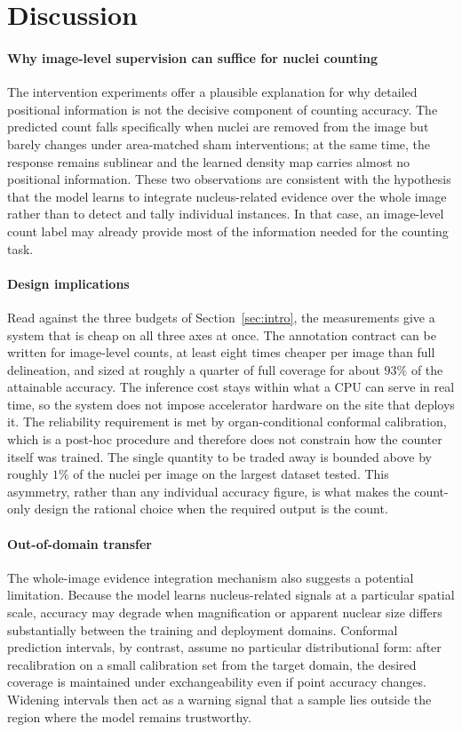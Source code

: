 \documentclass[preprint,12pt]{elsarticle}
\begin{document}
\section{Discussion}\label{sec:discuss}

\paragraph{Why image-level supervision can suffice for nuclei counting} The intervention experiments offer a
plausible explanation for why detailed positional information is not the decisive component of counting
accuracy. The predicted count falls specifically when nuclei are removed from the image but barely changes
under area-matched sham interventions; at the same time, the response remains sublinear and the learned density
map carries almost no positional information. These two observations are consistent with the hypothesis that
the model learns to integrate nucleus-related evidence over the whole image rather than to detect and tally
individual instances. In that case, an image-level count label may already provide most of the information
needed for the counting task.

\paragraph{Design implications} Read against the three budgets of Section~\ref{sec:intro}, the measurements
give a system that is cheap on all three axes at once. The annotation contract can be written for image-level
counts, at least eight times cheaper per image than full delineation, and sized at roughly a quarter of full
coverage for about $93\%$ of the attainable accuracy. The inference cost stays within what a CPU can serve in
real time, so the system does not impose accelerator hardware on the site that deploys it. The reliability
requirement is met by organ-conditional conformal calibration, which is a post-hoc procedure and therefore does
not constrain how the counter itself was trained. The single quantity to be traded away is bounded above by
roughly $1\%$ of the nuclei per image on the largest dataset tested. This asymmetry, rather than any individual
accuracy figure, is what makes the count-only design the rational choice when the required output is the count.

\paragraph{Out-of-domain transfer} The whole-image evidence integration mechanism also suggests a potential
limitation. Because the model learns nucleus-related signals at a particular spatial scale, accuracy may
degrade when magnification or apparent nuclear size differs substantially between the training and deployment
domains. Conformal prediction intervals, by contrast, assume no particular distributional form: after
recalibration on a small calibration set from the target domain, the desired coverage is maintained under
exchangeability even if point accuracy changes. Widening intervals then act as a warning signal that a sample
lies outside the region where the model remains trustworthy.
\end{document}
